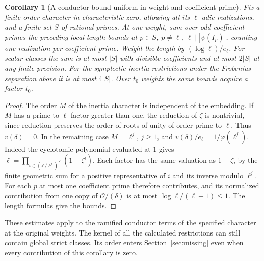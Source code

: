 \documentclass[a4paper,11pt]{article}
\newtheorem{corollary}[proposition]{Corollary}
\theoremstyle{definition}
\theoremstyle{remark}
\newcommand{\ZZ}{\mathbb Z}\newcommand{\ord}{\operatorname{ord}}
\numberwithin{equation}{section}
\begin{document}
\begin{corollary}[A conductor bound uniform in weight and coefficient prime]
\leavevmode\label{cor:sumconductor655}
Fix a finite order character in characteristic zero, allowing all its
\(\ell\)-adic realizations, and a finite set \(S\) of rational primes.
At one weight, sum over odd coefficient primes the preceding local
length bounds at \(p\in S\), \(p\ne\ell\), \(\ell\mid|\psi(I_p)|\),
counting one realization per coefficient prime. Weight the length by
\((\log\ell)/e_\ell\). For scalar classes the sum is at most \(|S|\)
with divisible coefficients and at most \(2|S|\) at any finite
precision. For the symplectic inertia restrictions under the
Frobenius separation above it is at most \(4|S|\). Over \(t_0\)
weights the same bounds acquire a factor \(t_0\).
\end{corollary}
\begin{proof}
The order \(M\) of the inertia character is independent of the
embedding. If \(M\) has a prime-to-\(\ell\) factor greater than one,
the reduction of \(\zeta\) is nontrivial, since reduction preserves
the order of roots of unity of order prime to \(\ell\). Thus
\(v(\delta)=0\). In the remaining case \(M=\ell^j\), \(j\ge1\),
and \(v(\delta)/e_\ell=1/\varphi(\ell^j)\). Indeed the cyclotomic
polynomial evaluated at \(1\) gives
\(\ell=\prod_{i\in(\ZZ/\ell^j)^\times}(1-\zeta^i)\).
Each factor has the same valuation as \(1-\zeta\), by the finite
geometric sum for a positive representative of \(i\) and its inverse
modulo \(\ell^j\). For each \(p\) at most one coefficient prime
therefore contributes, and its normalized contribution from one
copy of \(\mathcal O/(\delta)\) is at most
\(\log\ell/(\ell-1)\le1\). The length formulas give the bounds.
\end{proof}

These estimates apply to the ramified conductor terms of the
specified character at the original weights. The kernel of all
the calculated restrictions can still contain global strict
classes. Its order enters Section~\ref{sec:missing} even when
every contribution of this corollary is zero.

\clearpage
\end{document}
